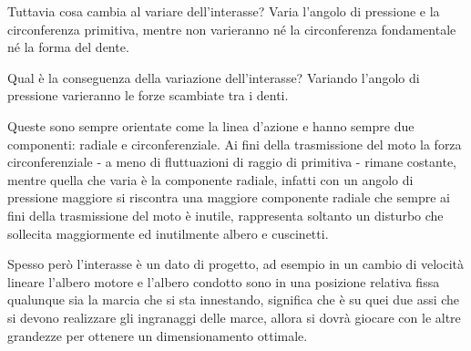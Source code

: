\documentclass[a4paper, 15pt]{article}
\begin{document}
\begin{adjustwidth}{2in}{}
		Tuttavia cosa cambia al variare dell'interasse? Varia l'angolo di pressione e la circonferenza primitiva, mentre non varieranno né la circonferenza fondamentale né la forma del dente.
		
		Qual è la conseguenza della variazione dell'interasse? Variando l'angolo di pressione varieranno le forze scambiate tra i denti.
		
		Queste sono sempre orientate come la linea d'azione e hanno sempre due componenti: radiale e circonferenziale. Ai fini della trasmissione del moto la forza circonferenziale  - a meno di fluttuazioni di raggio di primitiva - rimane costante, mentre quella che varia è la componente radiale, infatti con un angolo di pressione maggiore si riscontra una maggiore componente radiale che sempre ai fini della trasmissione del moto è inutile, rappresenta soltanto un disturbo che sollecita maggiormente ed inutilmente albero e cuscinetti. 
		
		Spesso però l'interasse è un dato di progetto, ad esempio in un cambio di velocità lineare l'albero motore e l'albero condotto sono in una posizione relativa fissa qualunque sia la marcia che si sta innestando, significa che è su quei due assi che si devono realizzare gli ingranaggi delle marce, allora si dovrà giocare con le altre grandezze per ottenere un dimensionamento ottimale.
	\end{adjustwidth}
\newpage
\end{document}
